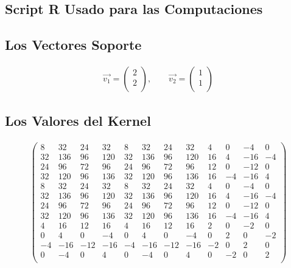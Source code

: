 \documentclass[fleqn]{llncs}
\begin{document}
\subsection{Script R Usado para las Computaciones}


\newpage

\subsection{Los Vectores Soporte}
\begin{align*}
	\overrightarrow{v_1} =
	\begin{pmatrix}
		2 \\
		2 \\
	\end{pmatrix},
	\qquad
	\overrightarrow{v_2} =
	\begin{pmatrix}
		1 \\
		1 \\
	\end{pmatrix}
\end{align*}

\subsection{Los Valores del Kernel}
\begin{align*}
	\begin{pmatrix}
		8 & 32 & 24 & 32 &  8 & 32 & 24 & 32 &  4 &  0 & -4 &  0 \\
		32 &136 & 96 &120 & 32 &136 & 96 &120 & 16 &  4 &-16 & -4 \\
		24 & 96 & 72 & 96 & 24 & 96 & 72 & 96 & 12 &  0 &-12 &  0 \\
		32 &120 & 96 &136 & 32 &120 & 96 &136 & 16 & -4 &-16 &  4 \\
		8 & 32 & 24 & 32 &  8 & 32 & 24 & 32 &  4 &  0 & -4 &  0 \\
		32 &136 & 96 &120 & 32 &136 & 96 &120 & 16 &  4 &-16 & -4 \\
		24 & 96 & 72 & 96 & 24 & 96 & 72 & 96 & 12 &  0 &-12 &  0 \\
		32 &120 & 96 &136 & 32 &120 & 96 &136 & 16 & -4 &-16 &  4 \\
		4 & 16 & 12 & 16 &  4 & 16 & 12 & 16 &  2 &  0 & -2 &  0 \\
		0 &  4 &  0 & -4 &  0 &  4 &  0 & -4 &  0 &  2 &  0 & -2 \\
		-4 &-16 &-12 &-16 & -4 &-16 &-12 &-16 & -2 &  0 &  2 &  0 \\
		0 & -4 &  0 &  4 &  0 & -4 &  0 &  4 &  0 & -2 &  0 &  2 \\
	\end{pmatrix}
\end{align*}
\end{document}
